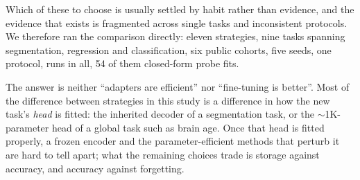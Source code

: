 \iffull\documentclass[journal]{IEEEtran}\else\documentclass[journal,twoside,web]{ieeecolor}\usepackage{generic}\fi
\begin{document}
Which of these to choose is usually settled by habit rather than evidence, and the evidence that exists is fragmented across single tasks and inconsistent protocols. We therefore ran the comparison directly: eleven strategies, nine tasks spanning segmentation, regression and classification, six public cohorts, five seeds, one protocol, \nruns{} runs in all, 54 of them closed-form probe fits.

The answer is neither ``adapters are efficient'' nor ``fine-tuning is better''. Most of the difference between strategies in this study is a difference in how the new task's \emph{head} is fitted: the inherited decoder of a segmentation task, or the $\sim$1K-parameter head of a global task such as brain age. Once that head is fitted properly, a frozen encoder and the parameter-efficient methods that perturb it are hard to tell apart; what the remaining choices trade is storage against accuracy, and accuracy against forgetting.
\end{document}
